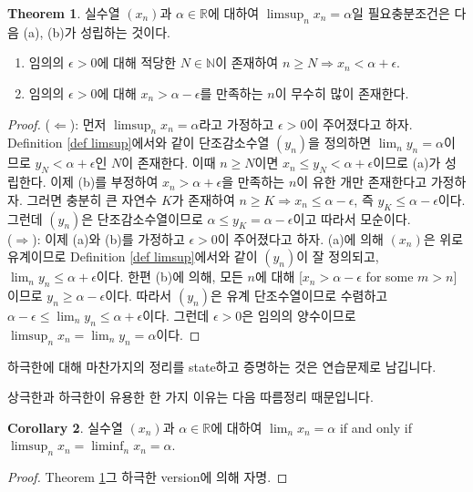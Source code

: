 \documentclass[12pt]{article}
\theoremstyle{definition}
\newtheorem{thm}{Theorem}[section]
\newtheorem{cor}[thm]{Corollary}
\def\NN{\mathbb{N}}
\def\RR{\mathbb{R}}
\def\eps{\epsilon}
\begin{document}
	\begin{thm} \label{thm limsup}
		실수열 \((x_n)\)과 \(\alpha \in \RR\)에 대하여 \(\limsup_n x_n = \alpha\)일 필요충분조건은 다음 (a), (b)가 성립하는 것이다.
		\begin{enumerate} [label=(\alph*), leftmargin=2\parindent]
			\item
			임의의 \(\eps > 0\)에 대해 적당한 \(N \in \NN\)이 존재하여 \(n \ge N \Rightarrow x_n < \alpha + \eps\).
			\item
			임의의 \(\eps > 0\)에 대해 \(x_n > \alpha - \eps\)를 만족하는 \(n\)이 무수히 많이 존재한다.
		\end{enumerate}
	\end{thm}
	\begin{proof}
		($\Leftarrow$): 먼저 \(\limsup_n x_n = \alpha\)라고 가정하고 \(\eps > 0\)이 주어졌다고 하자. Definition \ref{def limsup}에서와 같이 단조감소수열 \((y_n)\)을 정의하면 \(\lim_n y_n = \alpha\)이므로 \(y_N < \alpha + \eps\)인 \(N\)이 존재한다. 이때 \(n \ge N\)이면 \(x_n \le y_N < \alpha + \eps\)이므로 (a)가 성립한다. 이제 (b)를 부정하여 \(x_n > \alpha + \eps\)을 만족하는 \(n\)이 유한 개만 존재한다고 가정하자. 그러면 충분히 큰 자연수 \(K\)가 존재하여 \(n \ge K \Rightarrow x_n \le \alpha - \eps\), 즉 \(y_K \le \alpha - \eps\)이다. 그런데 \((y_n)\)은 단조감소수열이므로 \(\alpha \le y_K = \alpha - \eps\)이고 따라서 모순이다.\\
		($\Rightarrow$): 이제 (a)와 (b)를 가정하고 \(\eps > 0\)이 주어졌다고 하자. (a)에 의해 \((x_n)\)은 위로 유계이므로 Definition \ref{def limsup}에서와 같이 \((y_n)\)이 잘 정의되고, \(\lim_n y_n \le \alpha + \eps\)이다. 한편 (b)에 의해, 모든 \(n\)에 대해 [\(x_n > \alpha - \eps\) for some \(m > n\)]이므로 \(y_n \ge \alpha - \eps\)이다. 따라서 \((y_n)\)은 유계 단조수열이므로 수렴하고 \(\alpha- \eps \le \lim_n y_n \le \alpha + \eps\)이다. 그런데 \(\eps > 0\)은 임의의 양수이므로 \(\limsup_n x_n = \lim_n y_n = \alpha\)이다.
	\end{proof}

하극한에 대해 마찬가지의 정리를 state하고 증명하는 것은 연습문제로 남깁니다.

상극한과 하극한이 유용한 한 가지 이유는 다음 따름정리 때문입니다.

	\begin{cor}
		실수열 \((x_n)\)과 \(\alpha \in \RR\)에 대하여 \(\lim_n x_n = \alpha\) if and only if \(\limsup_n x_n = \liminf_n x_n = \alpha\).
	\end{cor}
	\begin{proof}
		Theorem \ref{thm limsup}\과 그 하극한 version에 의해 자명.
	\end{proof}
\end{document}
